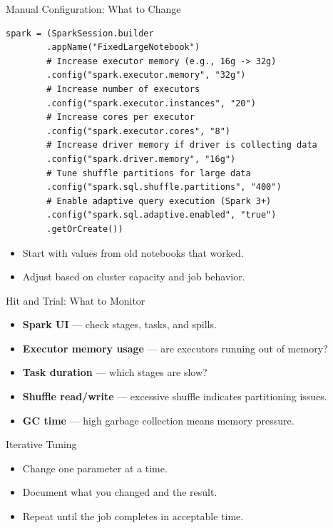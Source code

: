 \documentclass[aspectratio=169]{beamer}
\begin{document}
\begin{frame}[fragile]{Manual Configuration: What to Change}
	
	\begin{lstlisting}[style=sparkstyle, caption={Manually tuning Spark for a large job}]
		spark = (SparkSession.builder
		.appName("FixedLargeNotebook")
		# Increase executor memory (e.g., 16g -> 32g)
		.config("spark.executor.memory", "32g")
		# Increase number of executors
		.config("spark.executor.instances", "20")
		# Increase cores per executor
		.config("spark.executor.cores", "8")
		# Increase driver memory if driver is collecting data
		.config("spark.driver.memory", "16g")
		# Tune shuffle partitions for large data
		.config("spark.sql.shuffle.partitions", "400")
		# Enable adaptive query execution (Spark 3+)
		.config("spark.sql.adaptive.enabled", "true")
		.getOrCreate())
	\end{lstlisting}
	
	\begin{itemize}
		\item Start with values from old notebooks that worked.
		\item Adjust based on cluster capacity and job behavior.
	\end{itemize}
	
\end{frame}
	\begin{frame}{Hit and Trial: What to Monitor}
		\begin{itemize}
			\item \textbf{Spark UI} --- check stages, tasks, and spills.
			\item \textbf{Executor memory usage} --- are executors running out of memory?
			\item \textbf{Task duration} --- which stages are slow?
			\item \textbf{Shuffle read/write} --- excessive shuffle indicates partitioning issues.
			\item \textbf{GC time} --- high garbage collection means memory pressure.
		\end{itemize}
		
		\begin{block}{Iterative Tuning}
			\begin{itemize}
				\item Change one parameter at a time.
				\item Document what you changed and the result.
				\item Repeat until the job completes in acceptable time.
			\end{itemize}
		\end{block}
	\end{frame}
	
\end{document}
